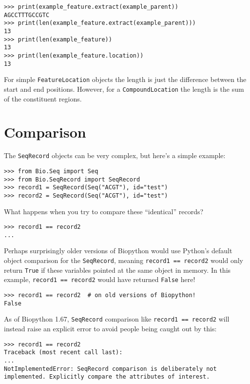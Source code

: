 \begin{verbatim}
>>> print(example_feature.extract(example_parent))
AGCCTTTGCCGTC
>>> print(len(example_feature.extract(example_parent)))
13
>>> print(len(example_feature))
13
>>> print(len(example_feature.location))
13
\end{verbatim}

For simple \verb|FeatureLocation| objects the length is just
the difference between the start and end positions. However,
for a \verb|CompoundLocation| the length is the sum of the
constituent regions.

\section{Comparison}

The \verb|SeqRecord| objects can be very complex, but here's a simple example:

\begin{verbatim}
>>> from Bio.Seq import Seq
>>> from Bio.SeqRecord import SeqRecord
>>> record1 = SeqRecord(Seq("ACGT"), id="test")
>>> record2 = SeqRecord(Seq("ACGT"), id="test")
\end{verbatim}

What happens when you try to compare these ``identical'' records?

\begin{verbatim}
>>> record1 == record2
...
\end{verbatim}

Perhaps surprisingly older versions of Biopython would use Python's default object
comparison for the \verb|SeqRecord|, meaning \verb|record1 == record2| would
only return \verb|True| if these variables pointed at the same object in memory.
In this example, \verb|record1 == record2| would have returned \verb|False|
here!

\begin{verbatim}
>>> record1 == record2  # on old versions of Biopython!
False
\end{verbatim}

As of Biopython 1.67, \verb|SeqRecord| comparison like \verb|record1 == record2|
will instead raise an explicit error to avoid people being caught out by this:

\begin{verbatim}
>>> record1 == record2
Traceback (most recent call last):
...
NotImplementedError: SeqRecord comparison is deliberately not implemented. Explicitly compare the attributes of interest.
\end{verbatim}

